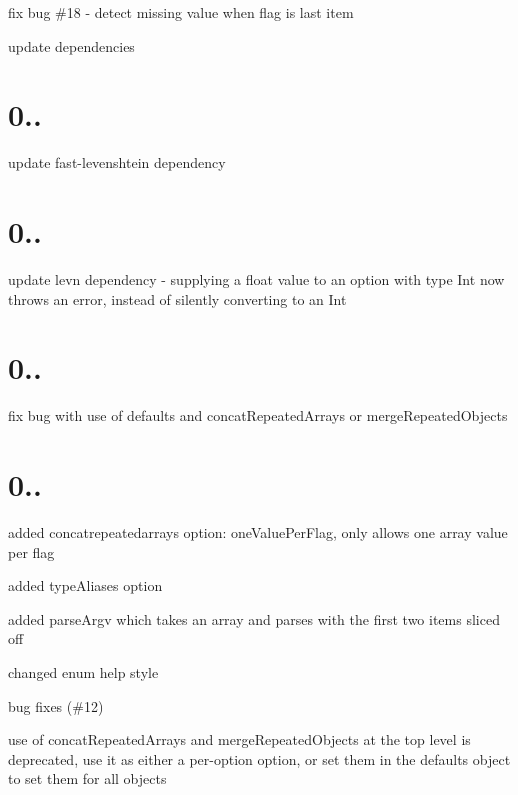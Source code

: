 
\begin{DoxyItemize}
\item fix bug \#18 -\/ detect missing value when flag is last item
\item update dependencies
\end{DoxyItemize}

\section*{0..}


\begin{DoxyItemize}
\item update {\ttfamily fast-\/levenshtein} dependency
\end{DoxyItemize}

\section*{0..}


\begin{DoxyItemize}
\item update {\ttfamily levn} dependency -\/ supplying a float value to an option with type {\ttfamily Int} now throws an error, instead of silently converting to an {\ttfamily Int}
\end{DoxyItemize}

\section*{0..}


\begin{DoxyItemize}
\item fix bug with use of {\ttfamily defaults} and {\ttfamily concat\+Repeated\+Arrays} or {\ttfamily merge\+Repeated\+Objects}
\end{DoxyItemize}

\section*{0..}


\begin{DoxyItemize}
\item added {\ttfamily concatrepeatedarrays} option\+: {\ttfamily one\+Value\+Per\+Flag}, only allows one array value per flag
\item added {\ttfamily type\+Aliases} option
\item added {\ttfamily parse\+Argv} which takes an array and parses with the first two items sliced off
\item changed enum help style
\item bug fixes (\#12)
\item use of {\ttfamily concat\+Repeated\+Arrays} and {\ttfamily merge\+Repeated\+Objects} at the top level is deprecated, use it as either a per-\/option option, or set them in the {\ttfamily defaults} object to set them for all objects
\end{DoxyItemize}

